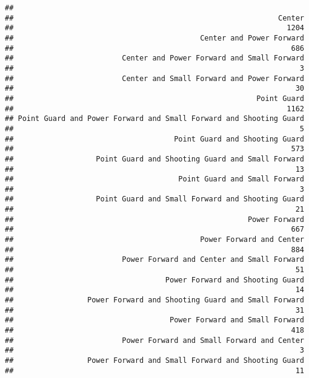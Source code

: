 \documentclass[
]{book}
\begin{document}
\begin{verbatim}
## 
##                                                             Center 
##                                                               1204 
##                                           Center and Power Forward 
##                                                                686 
##                         Center and Power Forward and Small Forward 
##                                                                  3 
##                         Center and Small Forward and Power Forward 
##                                                                 30 
##                                                        Point Guard 
##                                                               1162 
## Point Guard and Power Forward and Small Forward and Shooting Guard 
##                                                                  5 
##                                     Point Guard and Shooting Guard 
##                                                                573 
##                   Point Guard and Shooting Guard and Small Forward 
##                                                                 13 
##                                      Point Guard and Small Forward 
##                                                                  3 
##                   Point Guard and Small Forward and Shooting Guard 
##                                                                 21 
##                                                      Power Forward 
##                                                                667 
##                                           Power Forward and Center 
##                                                                884 
##                         Power Forward and Center and Small Forward 
##                                                                 51 
##                                   Power Forward and Shooting Guard 
##                                                                 14 
##                 Power Forward and Shooting Guard and Small Forward 
##                                                                 31 
##                                    Power Forward and Small Forward 
##                                                                418 
##                         Power Forward and Small Forward and Center 
##                                                                  3 
##                 Power Forward and Small Forward and Shooting Guard 
##                                                                 11 

\end{verbatim}
\end{document}

